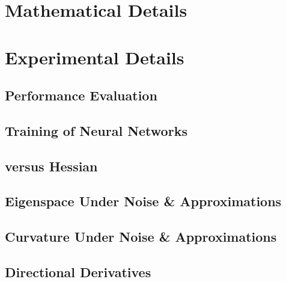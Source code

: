 \section{Mathematical Details}\label{vivit::sec:math-details}


\section{Experimental Details}\label{vivit::sec:experimental-details}



\subsection{Performance Evaluation}\label{vivit::sec:performance-experiments}

\clearpage

\subsection{Training of Neural Networks}\label{vivit::sec:training_of_nns}


\subsection{\ggn versus Hessian}\label{vivit::sec:ggn_vs_hessian}

\clearpage

\subsection{Eigenspace Under Noise \&
  Approximations}\label{vivit::sec:eigenspace_noise}


\subsection{Curvature Under Noise \&
  Approximations}\label{vivit::sec:curvature_noise}


\subsection{Directional Derivatives}\label{vivit::sec:directional_derivatives}


